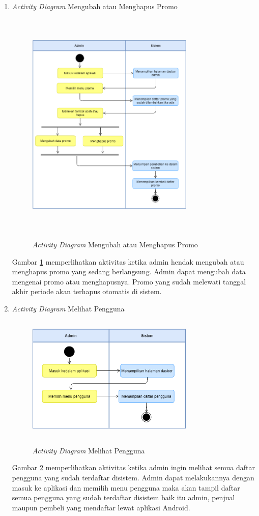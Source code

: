 \begin{enumerate}
	\newpage
	\item \textit{Activity Diagram} Mengubah atau Menghapus Promo
	\begin{figure}[H]
		\centering
		{\includegraphics [width = 8cm, height= 11cm]{gambar/activity diagram/ubah atau hapus promo}}
		\caption{\textit{Activity Diagram} Mengubah atau Menghapus Promo}
		\label{ubah atau hapus promo}
	\end{figure}
	\par Gambar \ref*{ubah atau hapus promo} memperlihatkan aktivitas ketika admin hendak mengubah atau menghapus promo yang sedang berlangsung. Admin dapat mengubah data mengenai promo atau menghapusnya. Promo yang sudah melewati tanggal akhir periode akan terhapus otomatis di sistem.

	\item \textit{Activity Diagram} Melihat Pengguna
	\begin{figure}[H]
		\centering
		{\includegraphics [width = 8cm, height= 6cm]{gambar/activity diagram/lihat pengguna}}
		\caption{\textit{Activity Diagram} Melihat Pengguna}
		\label{lihat pengguna}
	\end{figure}
	\par Gambar \ref*{lihat pengguna} memperlihatkan aktivitas ketika admin ingin melihat semua daftar pengguna yang sudah terdaftar disistem. Admin dapat melakukannya dengan masuk ke aplikasi dan memilih menu pengguna maka akan tampil daftar semua pengguna yang sudah terdaftar disistem baik itu admin, penjual maupun pembeli yang mendaftar lewat aplikasi Android.


\end{enumerate}
